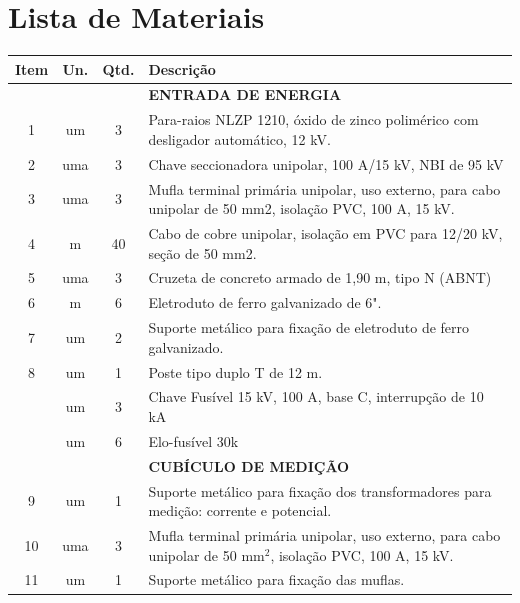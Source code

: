 \section{Lista de Materiais}
	
	\begin{table}[htbp]
	  \centering
	\begin{sideways}

	    \begin{tabular}{cccl}
	    \toprule
	    \textbf{Item} & \textbf{Un.} & \textbf{Qtd.} & \textbf{Descrição} \\
	    \midrule
	          &       &       & \textbf{ENTRADA DE ENERGIA} \\
	       1     & um    & 3     & Para-raios NLZP 1210, óxido de zinco polimérico com desligador automático, 12 kV. \\
	       2     & uma   & 3     & Chave seccionadora unipolar, 100 A/15 kV, NBI de 95 kV  \\
	       3     & uma   & 3     & Mufla terminal primária unipolar, uso externo, para cabo unipolar de 50 mm2, isolação PVC, 100 A, 15 kV. \\
	       4     & m     & 40    & Cabo de cobre unipolar, isolação em PVC para 12/20 kV, seção de 50 mm2. \\
	       5     & uma   & 3     & Cruzeta de concreto armado de 1,90 m, tipo N (ABNT) \\
	       6     & m     & 6     & Eletroduto de ferro galvanizado de 6". \\
	       7     & um    & 2     & Suporte metálico para fixação de eletroduto de ferro galvanizado. \\
	       8     & um    & 1     & Poste tipo duplo T de 12 m. \\
	             & um    & 3     & Chave Fusível 15 kV, 100 A, base C, interrupção de 10 kA \\
	             & um    & 6     & Elo-fusível 30k \\
	             &       &       & \textbf{CUBÍCULO DE MEDIÇÃO} \\
	       9     & um    & 1     & Suporte metálico para fixação dos transformadores para medição: corrente e potencial. \\
	       10    & uma   & 3     & Mufla terminal primária unipolar, uso externo, para cabo unipolar de 50 mm$^{2}$, isolação PVC, 100 A, 15 kV. \\
	       11    & um    & 1     & Suporte metálico para fixação das muflas. \\

\end{tabular}
\end{sideways}
\end{table}
